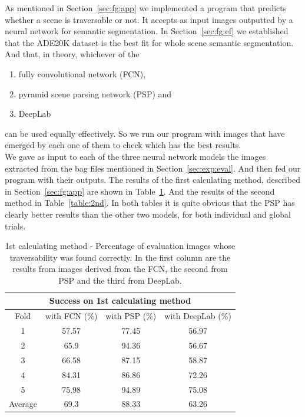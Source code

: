 \documentclass[12pt,a4paper,table,dvipsnames,tikz]{report}
\newcommand{\acronym}{\MakeUppercase}
\newcommand{\bl}[1]{{\hypersetup{linkcolor=blue}#1}}
\begin{document}
	As mentioned in Section~\ref{sec:fg:app} we implemented a program that predicts whether 
	a scene is traversable or not. It accepts as input images outputted by a neural network 
	for semantic segmentation. In Section~\ref{sec:fg:ef} we established that the 
	\acronym{ade20k} dataset is the best fit for whole scene semantic segmentation. And that, 
	in theory, whichever of the
	\begin{enumerate}
		\item fully convolutional network (\acronym{fcn}), 
		\item pyramid scene parsing network (\acronym{psp}) and 
		\item DeepLab 
	\end{enumerate}
	can be used equally effectively. So we run our program with images that have emerged by 
	each one of them to check which has the best results.
	\\
	
	We gave as input to each of the three neural network models the images extracted from the 
	bag files mentioned in Section~\ref{sec:exp:eval}. And then fed our program with their 
	outputs. The results of the first calculating method, described in Section~\ref{sec:fg:app} 
	are shown in Table~\bl{\ref{table:1st}}. And the results of the second method in 
	Table~\bl{\ref{table:2nd}}. In both tables it is quite obvious that the PSP has clearly 
	better results than the other two models, for both individual and global trials.
	\\
	
	\begin{table}[h!]
		\centering
		\begin{tabular}{|c|c|c|c|}
			\hline
			\multicolumn{4}{|c|}{Success on 1st calculating method}\\
			\hline
			Fold & with \acronym{fcn} (\%) & with \acronym{psp} (\%) & with DeepLab (\%)\\ 
			\hline\hline
			1 & 57.57 & 77.45 & 56.97\\
			\hline
			2 & 65.9 & 94.36 & 56.67\\
			\hline
			3 & 66.58 & 87.15 & 58.87\\
			\hline
			4 & 84.31 & 86.86 & 72.26\\
			\hline
			5 & 75.98 & 94.89 & 75.08\\
			\hline\hline
			Average & 69.3 & 88.33 & 63.26\\
			\hline
		\end{tabular}
		\caption{1st calculating method - Percentage of evaluation images whose 
		traversability was found correctly. In the first column are the results from 
		images derived from the \acronym{fcn}, the second from \acronym{psp} and the 
		third from DeepLab.}
		\label{table:1st}
	\end{table}
	
\end{document}
